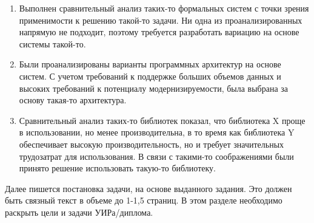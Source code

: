\begin{enumerate}
	\item Выполнен сравнительный анализ таких-то формальных систем с точки зрения применимости к решению такой-то задачи. Ни одна из проанализированных напрямую не подходит, поэтому требуется разработать вариацию на основе системы такой-то.
	\item Были проанализированы варианты программных архитектур на основе систем. С учетом требований к поддержке больших объемов данных и высоких требований к потенциалу модернизируемости, была выбрана за основу такая-то архитектура.
	\item Сравнительный анализ таких-то библиотек показал, что библиотека X проще в использовании, но менее производительна, в то время как библиотека Y обеспечивает высокую производительность, но и требует значительных трудозатрат для использования. В связи с такими-то соображениями были принято решение использовать такую-то библиотеку.
\end{enumerate}

Далее пишется постановка задачи, на основе выданного задания. Это должен быть связный текст в объеме до 1-1,5 страниц. В этом разделе необходимо раскрыть цели и задачи УИРа/диплома.
